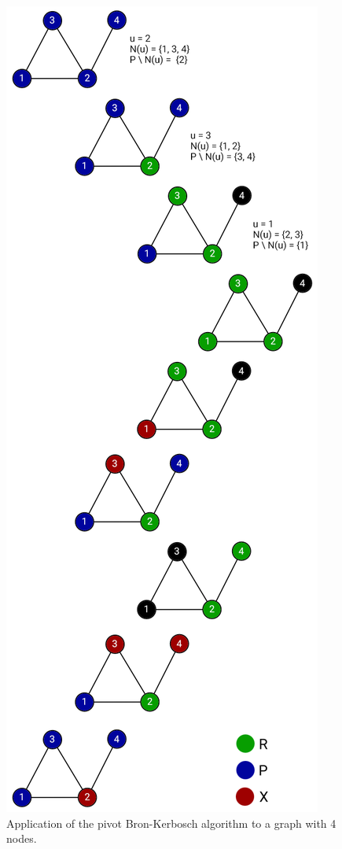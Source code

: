 \documentclass[11pt]{article}
\begin{document}
\begin{figure}[p]
\centering
\includegraphics[scale=0.9]{img/ex_bk_tomita.png}
\caption{Application of the pivot Bron-Kerbosch algorithm to a graph with 4
nodes.}
\label{fig:bkt}
\end{figure}
\end{document}
